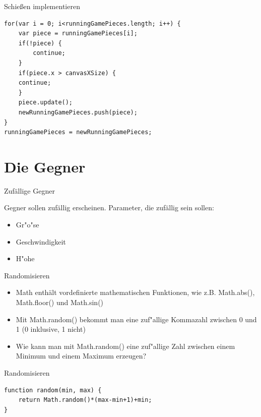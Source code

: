 \documentclass[18pt]{beamer}
\begin{document}
\begin{frame}[fragile]{Schießen implementieren}
\begin{lstlisting}
for(var i = 0; i<runningGamePieces.length; i++) {
	var piece = runningGamePieces[i];
	if(!piece) {
		continue;
	}
	if(piece.x > canvasXSize) {
	continue;
	}
	piece.update();
	newRunningGamePieces.push(piece);
}
runningGamePieces = newRunningGamePieces;
\end{lstlisting}
\end{frame}


\section{Die Gegner}
\begin{frame}{Zufällige Gegner}

Gegner sollen zufällig erscheinen.
Parameter, die zufällig sein sollen:
\begin{itemize}
	\item Gr"o"se
	\item Geschwindigkeit
	\item H"ohe
\end{itemize}
\end{frame}

\begin{frame}{Randomisieren}
\begin{itemize}
	\item Math enthält vordefinierte mathematischen Funktionen, wie z.B. \glqq Math.abs()\grqq{}, \glqq Math.floor() \grqq{} und \glqq Math.sin()\grqq{}
	\item Mit \glqq Math.random()\grqq{} bekommt man eine zuf"allige Kommazahl zwischen 0 und 1 (0 inklusive, 1 nicht)
	\item Wie kann man mit \glqq Math.random()\grqq{} eine zuf"allige Zahl zwischen einem Minimum und einem Maximum erzeugen?
	
\end{itemize}
\end{frame}

\begin{frame}[fragile]{Randomisieren}
\begin{lstlisting}
function random(min, max) {
	return Math.random()*(max-min+1)+min;
}
\end{lstlisting}
\end{frame}
\end{document}
